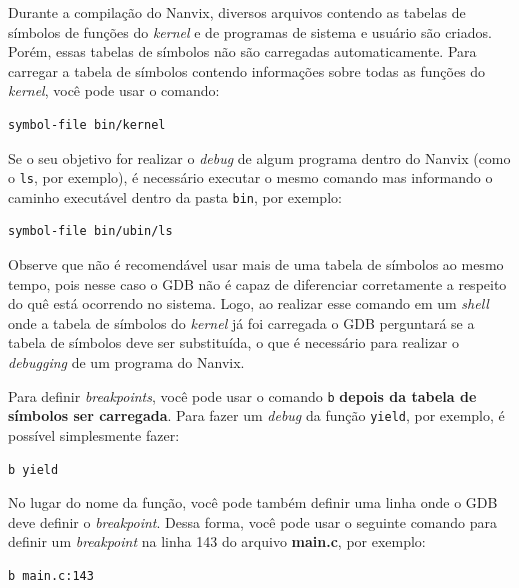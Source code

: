 \documentclass[11pt]{article}
\begin{document}
Durante a compilação do Nanvix, diversos arquivos contendo as tabelas de símbolos de funções do \textit{kernel} e de programas de sistema e usuário são criados. Porém, essas tabelas de símbolos não são carregadas automaticamente. Para carregar a tabela de símbolos contendo informações sobre todas as funções do \textit{kernel}, você pode usar o comando:\\

\begin{lstlisting}[language=sh,numbers=none,frame=single]
symbol-file bin/kernel
\end{lstlisting}

Se o seu objetivo for realizar o \textit{debug} de algum programa dentro do Nanvix (como o \texttt{ls}, por exemplo), é necessário executar o mesmo comando mas informando o caminho executável dentro da pasta \texttt{bin}, por exemplo:\\

\begin{lstlisting}[language=sh,numbers=none,frame=single]
symbol-file bin/ubin/ls
\end{lstlisting}

Observe que não é recomendável usar mais de uma tabela de símbolos ao mesmo tempo, pois nesse caso o GDB não é capaz de diferenciar corretamente a respeito do quê está ocorrendo no sistema. Logo, ao realizar esse comando em um \textit{shell} onde a tabela de símbolos do \textit{kernel} já foi carregada o GDB perguntará se a tabela de símbolos deve ser substituída, o que é necessário para realizar o \textit{debugging} de um programa do Nanvix.

Para definir \textit{breakpoints}, você pode usar o comando \texttt{b} \textbf{depois da tabela de símbolos ser carregada}. Para fazer um \textit{debug} da função \texttt{yield}, por exemplo, é possível simplesmente fazer:\\

\begin{lstlisting}[language=sh,numbers=none,frame=single]
b yield
\end{lstlisting}

No lugar do nome da função, você pode também definir uma linha onde o GDB deve definir o \textit{breakpoint}. Dessa forma, você pode usar o seguinte comando para definir um \textit{breakpoint} na linha 143 do arquivo \textbf{main.c}, por exemplo:\\

\begin{lstlisting}[language=sh,numbers=none,frame=single]
b main.c:143
\end{lstlisting}
\end{document}
